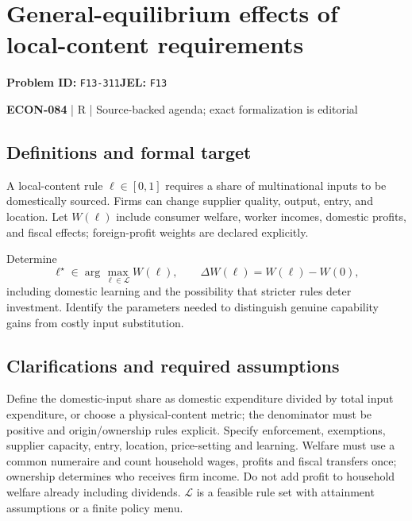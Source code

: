 \documentclass[11pt,a4paper]{article}
\begin{document}
\section*{General-equilibrium effects of local-content requirements}
\textbf{Problem ID:} \texttt{F13-311}\quad \textbf{JEL:} \texttt{F13}\par
\label{problem:OP-0646}


\label{audited:ECON-084}

{\sffamily\small\color{muted}\textbf{ECON-084} | R | Source-backed agenda; exact formalization is editorial\par}

\subsection*{Definitions and formal target}

A local-content rule $\ell\in[0,1]$ requires a share of multinational inputs to be domestically sourced. Firms can change supplier quality, output, entry, and location. Let $W(\ell)$ include consumer welfare, worker incomes, domestic profits, and fiscal effects; foreign-profit weights are declared explicitly.

Determine
\[
 \ell^\star\in\arg\max_{\ell\in\mathcal L}W(\ell),\qquad
 \Delta W(\ell)=W(\ell)-W(0),
\]
including domestic learning and the possibility that stricter rules deter investment. Identify the parameters needed to distinguish genuine capability gains from costly input substitution.

\subsection*{Clarifications and required assumptions}

Define the domestic-input share as domestic expenditure divided by total input expenditure, or choose a physical-content metric; the denominator must be positive and origin/ownership rules explicit. Specify enforcement, exemptions, supplier capacity, entry, location, price-setting and learning. Welfare must use a common numeraire and count household wages, profits and fiscal transfers once; ownership determines who receives firm income. Do not add profit to household welfare already including dividends. \(\mathcal L\) is a feasible rule set with attainment assumptions or a finite policy menu.
\end{document}
